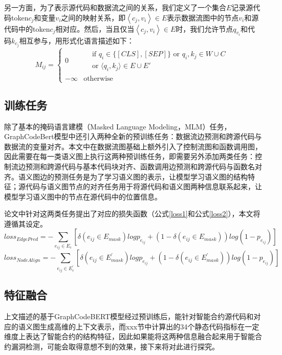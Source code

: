 另一方面，为了表示源代码和数据流之间的关系，我们定义了一个集合$E$记录源代码token$c_j$和变量$v_i$之间的映射关系，即$\left\langle c_j,v_i \right\rangle \in E$表示数据流图中的节点$v_i$和源代码中的token$c_j$相对应。然后，当且仅当$\left\langle c_j,v_i \right\rangle \in E$时，我们允许节点$q_{v_i}$和代码$k_{c_j}$相互参与，用形式化语言描述如下：
\begin{equation}
    M_{ij} =
    \begin{cases}
        0 & \begin{aligned}
               &\text{if } q_i \in \{[CLS], [SEP]\} \text{ or } q_i, k_j \in W \cup C \\
               &\text{or } \langle q_i, k_j \rangle \in E \cup E'
           \end{aligned} \\
        -\infty & \text{otherwise}
    \end{cases}
    \label{eq:mask}
\end{equation}

\subsection{训练任务}
\label{sec:训练任务}
除了基本的掩码语言建模（Masked Language Modeling，MLM）任务\cite{devlin2018bert}，GraphCodeBert模型中还引入两种全新的预训练任务：数据流边预测和跨源代码与数据流的变量对齐。本文中在数据流图基础上额外引入了控制流图和函数调用图，因此需要在每一类语义图上执行这两种预训练任务，即需要另外添加两类任务：控制流边预测和跨源代码与基本代码块对齐、函数调用边预测和跨源代码与函数名对齐。语义图边的预测任务是为了学习语义图的表示，让模型学习语义图的结构特征；源代码与语义图节点的对齐任务用于将源代码和语义图两种信息联系起来，让模型学习语义图中的节点在源代码中的位置信息。

论文\cite{guo2020graphcodebert}中针对这两类任务提出了对应的损失函数（公式\eqref{loss1}和公式\eqref{loss2}），本文将遵循其设定。
\begin{equation}
loss_{EdgePred}=-\sum_{e_{ij}\in E_{c}}[\delta(e_{ij}\in E_{mask})logp_{e_{ij}}+(1-\delta(e_{ij}\in E_{mask}))log(1-p_{e_{ij}})] \label{loss1}
\end{equation}
\begin{equation}
loss_{NodeAlign}=-\sum_{e_{ij}\in E_{c}^{'}}[\delta(e_{ij}\in E_{mask}^{'})logp_{e_{ij}}+(1-\delta(e_{ij}\in E_{mask}^{'}))log(1-p_{e_{ij}})] \label{loss2}
\end{equation}

\subsection{特征融合}
\label{sec:特征融合}
上文描述的基于GraphCodeBERT模型经过预训练后，能针对智能合约源代码和对应的语义图生成高维的上下文表示，而xxx节中计算出的34个静态代码指标在一定维度上表达了智能合约的结构特征，因此如果能将这两种信息融合起来用于智能合约漏洞检测，可能会取得意想不到的效果，接下来将对此进行探究。

